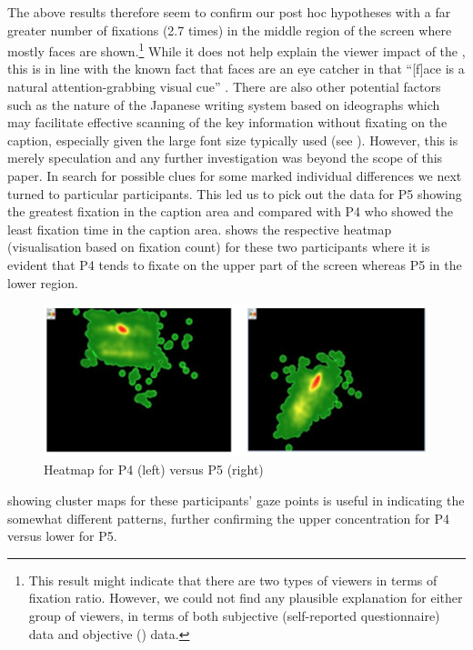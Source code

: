 \documentclass[output=paper]{langsci/langscibook}
\begin{document}
The above results therefore seem to confirm our post hoc hypotheses with a far greater number of fixations (2.7 times) in the middle region of the screen where mostly faces are shown.\footnote{ This result might indicate that there are two types of viewers in terms of fixation ratio. However, we could not find any plausible explanation for either group of viewers, in terms of both subjective (self-reported questionnaire) data and objective () data.} While it does not help explain the viewer impact of the , this is in line with the known fact that faces are an eye catcher in that ``[f]ace is a natural attention-grabbing visual cue'' \citep[264]{perego2010}. There are also other potential factors such as the nature of the Japanese writing system based on ideographs which may facilitate effective scanning of the key information without fixating on the caption, especially given the large font size typically used (see ). However, this is merely speculation and any further investigation was beyond the scope of this paper. In search for possible clues for some marked individual differences we next turned to particular participants.  This led us to pick out the data for P5 showing the greatest fixation in the caption area and compared with P4 who showed the least fixation time in the caption area.   shows the respective heatmap (visualisation based on fixation count) for these two participants where it is evident that P4 tends to fixate on the upper part of the screen whereas P5 in the lower region.
 
\begin{figure}[t]
 \includegraphics[width=\textwidth]{figures/OHagan6.png}
\caption{Heatmap for P4 (left) versus P5 (right)}
\label{ohagan:fig:6}
\end{figure}

 showing cluster maps for these participants' gaze points is useful in indicating the somewhat different  patterns, further confirming the upper concentration for P4 versus lower for P5.
\end{document}
